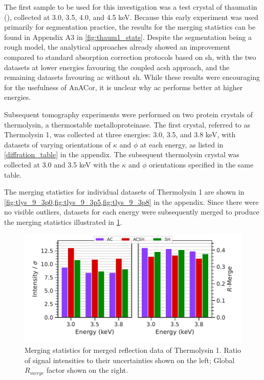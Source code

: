 The first sample to be used for this investigation was a test crystal of thaumatin (), collected at 3.0, 3.5, 4.0, and 4.5 \unit{keV}. Because this early experiment was used primarily for segmentation practice, the results for the merging statistics can be found in Appendix A3 in \cref{fig:thaum1_stats}. Despite the segmentation being a rough model, the analytical approaches already showed an improvement compared to standard absorption correction protocols based on \ac{sh}, with the two datasets at lower energies favouring the coupled \ac{acsh} approach, and the remaining datasets favouring \ac{ac} without \ac{sh}. While these results were encouraging for the usefulness of AnACor, it is unclear why \ac{ac} performs better at higher energies. 

Subsequent tomography experiments were performed on two protein crystals of thermolysin, a thermostable metalloproteinase. The first crystal, referred to as Thermolysin 1, was collected at three energies: 3.0, 3.5, and 3.8 \unit{keV}, with datasets of varying orientations of $\kappa$ and $\phi$ at each energy, as listed in \cref{diffration_table} in the appendix. The subsequent thermolysin crystal was collected at 3.0 and 3.5 \unit{keV} with the $\kappa$ and $\phi$ orientations specified in the same table.

The merging statistics for individual datasets of Thermolysin 1 are shown in \cref{fig:tlys_9_3p0,fig:tlys_9_3p5,fig:tlys_9_3p8} in the appendix. Since there were no visible outliers, datasets for each energy were subsequently merged to produce the merging statistics illustrated in \cref{fig:tlys_9_stats}.%

\begin{figure}
    \centering
    \includegraphics{plots/exp1/tlys_9_P6122/merged_stats.pdf}
    \caption{Merging statistics for merged reflection data of Thermolysin 1. Ratio of signal intensities to their uncertainties shown on the left; Global $R_{merge}$ factor shown on the right.}
    \label{fig:tlys_9_stats}
\end{figure}


